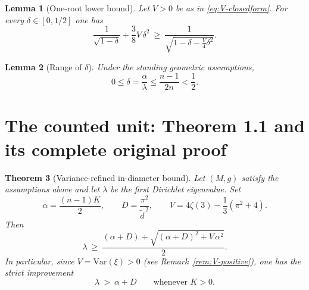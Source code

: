 \documentclass[10pt,a4paper]{amsart}
\newcommand{\Var}{\mathrm{Var}}
\newcommand{\de}{\tilde d}
\theoremstyle{plain}
\newtheorem{theorem}{Theorem}
\newtheorem{lemma}[theorem]{Lemma}
\theoremstyle{remark}
\begin{document}
\begin{lemma}[One-root lower bound]
\label{lem:one-root}
Let $V>0$ be as in \eqref{eq:V-closedform}.
For every $\delta\in[0,1/2]$ one has
\begin{equation}
\label{eq:one-root}
\frac{1}{\sqrt{1-\delta}}+\frac{3}{8}V\,\delta^2
\ \ge\
\frac{1}{\sqrt{1-\delta-\frac{V}{4}\delta^2}}.
\end{equation}
\end{lemma}


\begin{lemma}[Range of $\delta$]
\label{lem:delta-range}
Under the standing geometric assumptions,
\begin{equation}
0\le \delta=\frac{\alpha}{\lambda}\le \frac{n-1}{2n}<\frac{1}{2}.
\end{equation}
\end{lemma}


\section{The counted unit: Theorem 1.1 and its complete original proof}

\begin{theorem}[Variance-refined in-diameter bound]
\label{thm:main}
Let $(M,g)$ satisfy the assumptions above and let $\lambda$ be the first Dirichlet eigenvalue.
Set
\begin{equation}
\alpha = \frac{(n-1)K}{2},
\qquad
D=\frac{\pi^2}{\de^{\,2}},
\qquad
V = 4\zeta(3)-\frac{1}{3}(\pi^2+4).
\end{equation}
Then
\begin{equation}
\label{eq:mainbound}
\lambda\ \ge\
\frac{(\alpha+D)+\sqrt{(\alpha+D)^2+V\,\alpha^2}}{2}.
\end{equation}
In particular, since $V=\Var(\xi)>0$ (see Remark~\ref{rem:V-positive}), one has the strict improvement
\begin{equation}
\lambda\ >\ \alpha + D
\qquad
\text{whenever }K>0.
\end{equation}
\end{theorem}
\end{document}
